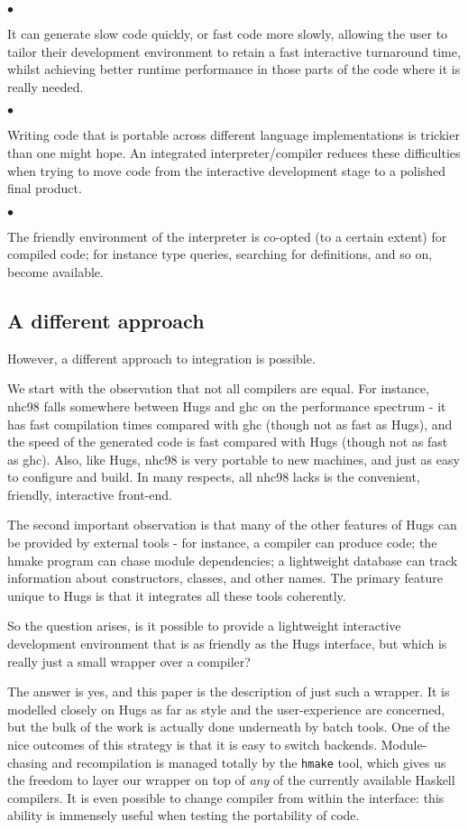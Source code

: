 \documentclass[a4paper]{article}
\begin{document}
$\bullet$
  \parbox[t]{11cm}{
    It can generate slow code quickly, or fast code more slowly,
      allowing the user to tailor their development environment
      to retain a fast interactive turnaround time, whilst achieving
      better runtime performance in those parts of the code where it
      is really needed.}

$\bullet$
  \parbox[t]{11cm}{
    Writing code that is portable across different language implementations
      is trickier than one might hope.  An integrated interpreter/compiler
      reduces these difficulties when trying to move code from the
      interactive development stage to a polished final product.}

$\bullet$
  \parbox[t]{11cm}{
    The friendly environment of the interpreter is co-opted (to a
      certain extent) for compiled code; for instance type queries,
      searching for definitions, and so on, become available.}


\subsection*{A different approach}
\noindent
However, a different approach to integration is possible.

We start with the observation that not all compilers are equal.
For instance, nhc98 falls somewhere between Hugs and ghc on the
performance spectrum - it has fast compilation times compared with
ghc (though not as fast as Hugs), and the speed of the generated
code is fast compared with Hugs (though not as fast as ghc).  Also,
like Hugs, nhc98 is very portable to new machines, and just as easy
to configure and build.  In many respects, all nhc98 lacks is the
convenient, friendly, interactive front-end.

The second important observation is that many of the other features
of Hugs can be provided by external tools - for instance, a compiler
can produce code; the hmake program can chase module dependencies;
a lightweight database can track information about constructors,
classes, and other names.  The primary feature unique to Hugs is that
it integrates all these tools coherently.

So the question arises, is it possible to provide a lightweight
interactive development environment that is as friendly as the Hugs
interface, but which is really just a small wrapper over a compiler?

The answer is yes, and this paper is the description of just such
a wrapper.  It is modelled closely on Hugs as far as style and the
user-experience are concerned, but the bulk of the work is actually
done underneath by batch tools.  One of the nice outcomes of this
strategy is that it is easy to switch backends.  Module-chasing and
recompilation is managed totally by the {\tt hmake} tool, which
gives us the freedom to layer our wrapper on top of {\em any} of the
currently available Haskell compilers.  It is even possible to change
compiler from within the interface: this ability is immensely useful
when testing the portability of code.
\end{document}
